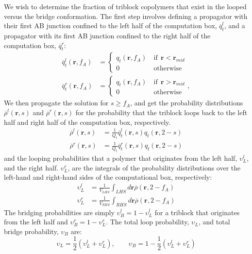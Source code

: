 \documentclass[twocolumn,aps,floatfix,nobibnotes]{revtex4-1}
\begin{document}
We wish to determine the fraction of triblock copolymers that exist in the looped versus the bridge conformation. The first step involves defining a propagator with their first AB junction confined to the left half of the computation box, $\overline{q}_t^l$, and a propagator with its first AB junction confined to the right half of the computation box, $\overline{q}_t^r$:
\begin{align}
\overline{q}_t^l (\textbf{r}, f_A) &= \begin{cases}
q_t(\textbf{r},f_A) \ &\text{if} \ \ \textbf{r} < \textbf{r}_{mid} \\
0 \  &\text{otherwise}
\end{cases}\\
\overline{q}_t^r (\textbf{r}, f_A) &= \begin{cases}
q_t(\textbf{r},f_A) \ &\text{if} \ \ \textbf{r} > \textbf{r}_{mid} \\
0 \  &\text{otherwise}
\end{cases},
\end{align}
We then propagate the solution for $s \geq f_A$, and get the probability distributions $\overline{\rho}^l (\textbf{r},s)$ and $\overline{\rho}^r (\textbf{r},s)$ for the probability that the triblock loops back to the left half and right half of the computation box, respectively.
\begin{align}
\overline{\rho}^l (\textbf{r}, s) &= \frac{1}{Q_t}  \overline{q}_t^l (\textbf{r},s) q_t(\textbf{r},2-s)\\ \overline{\rho}^r (\textbf{r}, s) &= \frac{1}{Q_t} \overline{q}_t^r (\textbf{r},s) q_t(\textbf{r},2-s)
\end{align}
and the looping probabilities that a polymer that originates from the left half, $\upsilon_L^l$, and the right half. $\upsilon_L^r$, are the integrals of the probability distributions over the left-hand and right-hand sides of the computational box, respectively:
\begin{align}
\upsilon_L^l &= \frac{1}{V_{LHS}} \int_{LHS} d\textbf{r} \overline{\rho} (\textbf{r}, 2-f_A)\\
 \upsilon_L^r &= \frac{1}{V_{RHS}} \int_{RHS} d\textbf{r} \overline{\rho} (\textbf{r}, 2-f_A)
\end{align}
The bridging probabilities are simply $\upsilon_B^l = 1- \upsilon_L^l$ for a triblock that originates from the left half and $\upsilon_B^r = 1- \upsilon_L^r$. The total loop probability, $\upsilon_L$, and total bridge probability, $\upsilon_B$ are:
\begin{equation}
\upsilon_L = \frac{1}{2} (\upsilon_L^l + \upsilon_L^r), \quad \quad \upsilon_B = 1- \frac{1}{2} (\upsilon_L^l + \upsilon_L^r)
\end{equation}
\end{document}
